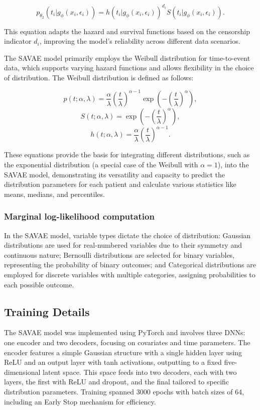 \documentclass{article}
\begin{document}
\begin{equation}
p_{\theta_2} (t_i|g_\phi(x_i, \epsilon_i)) = h(t_i|g_\phi(x_i, \epsilon_i))^{d_i} S(t_i|g_\phi(x_i, \epsilon_i)).
\end{equation}

This equation adapts the hazard and survival functions based on the censorship indicator \(d_i\), improving the model's reliability across different data scenarios.

The SAVAE model primarily employs the Weibull distribution for time-to-event data, which supports varying hazard functions and allows flexibility in the choice of distribution. The Weibull distribution is defined as follows:

\begin{equation}
p(t; \alpha, \lambda) = \frac{\alpha}{\lambda} \left(\frac{t}{\lambda}\right)^{\alpha-1} \exp\left(-\left(\frac{t}{\lambda}\right)^\alpha\right),
\end{equation}
\begin{equation}
S(t; \alpha, \lambda) = \exp\left(-\left(\frac{t}{\lambda}\right)^\alpha\right),
\end{equation}
\begin{equation}
h(t; \alpha, \lambda) = \frac{\alpha}{\lambda} \left(\frac{t}{\lambda}\right)^{\alpha-1}.
\end{equation}

These equations provide the basis for integrating different distributions, such as the exponential distribution (a special case of the Weibull with \(\alpha = 1\)), into the SAVAE model, demonstrating its versatility and capacity to predict the distribution parameters for each patient and calculate various statistics like means, medians, and percentiles.

\subsubsection{Marginal log-likelihood computation}
In the SAVAE model, variable types dictate the choice of distribution: Gaussian distributions are used for real-numbered variables due to their symmetry and continuous nature; Bernoulli distributions are selected for binary variables, representing the probability of binary outcomes; and Categorical distributions are employed for discrete variables with multiple categories, assigning probabilities to each possible outcome.

\subsection{Training Details}
The SAVAE model was implemented using PyTorch and involves three DNNs: one encoder and two decoders, focusing on covariates and time parameters. The encoder features a simple Gaussian structure with a single hidden layer using ReLU and an output layer with tanh activations, outputting to a fixed five-dimensional latent space. This space feeds into two decoders, each with two layers, the first with ReLU and dropout, and the final tailored to specific distribution parameters. Training spanned 3000 epochs with batch sizes of 64, including an Early Stop mechanism for efficiency.
\end{document}
